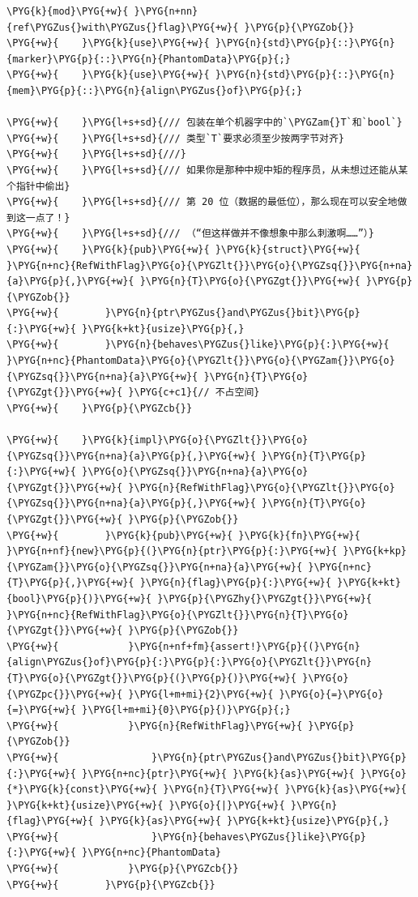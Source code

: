 \begin{Verbatim}[commandchars=\\\{\},breaklines=true,breakanywhere=true,fontsize=\codefont,xleftmargin=17bp]
\PYG{k}{mod}\PYG{+w}{ }\PYG{n+nn}{ref\PYGZus{}with\PYGZus{}flag}\PYG{+w}{ }\PYG{p}{\PYGZob{}}
\PYG{+w}{    }\PYG{k}{use}\PYG{+w}{ }\PYG{n}{std}\PYG{p}{::}\PYG{n}{marker}\PYG{p}{::}\PYG{n}{PhantomData}\PYG{p}{;}
\PYG{+w}{    }\PYG{k}{use}\PYG{+w}{ }\PYG{n}{std}\PYG{p}{::}\PYG{n}{mem}\PYG{p}{::}\PYG{n}{align\PYGZus{}of}\PYG{p}{;}

\PYG{+w}{    }\PYG{l+s+sd}{/// 包装在单个机器字中的`\PYGZam{}T`和`bool`}
\PYG{+w}{    }\PYG{l+s+sd}{/// 类型`T`要求必须至少按两字节对齐}
\PYG{+w}{    }\PYG{l+s+sd}{///}
\PYG{+w}{    }\PYG{l+s+sd}{/// 如果你是那种中规中矩的程序员，从未想过还能从某个指针中偷出}
\PYG{+w}{    }\PYG{l+s+sd}{/// 第 20 位（数据的最低位），那么现在可以安全地做到这一点了！}
\PYG{+w}{    }\PYG{l+s+sd}{/// （“但这样做并不像想象中那么刺激啊……”）}
\PYG{+w}{    }\PYG{k}{pub}\PYG{+w}{ }\PYG{k}{struct}\PYG{+w}{ }\PYG{n+nc}{RefWithFlag}\PYG{o}{\PYGZlt{}}\PYG{o}{\PYGZsq{}}\PYG{n+na}{a}\PYG{p}{,}\PYG{+w}{ }\PYG{n}{T}\PYG{o}{\PYGZgt{}}\PYG{+w}{ }\PYG{p}{\PYGZob{}}
\PYG{+w}{        }\PYG{n}{ptr\PYGZus{}and\PYGZus{}bit}\PYG{p}{:}\PYG{+w}{ }\PYG{k+kt}{usize}\PYG{p}{,}
\PYG{+w}{        }\PYG{n}{behaves\PYGZus{}like}\PYG{p}{:}\PYG{+w}{ }\PYG{n+nc}{PhantomData}\PYG{o}{\PYGZlt{}}\PYG{o}{\PYGZam{}}\PYG{o}{\PYGZsq{}}\PYG{n+na}{a}\PYG{+w}{ }\PYG{n}{T}\PYG{o}{\PYGZgt{}}\PYG{+w}{ }\PYG{c+c1}{// 不占空间}
\PYG{+w}{    }\PYG{p}{\PYGZcb{}}

\PYG{+w}{    }\PYG{k}{impl}\PYG{o}{\PYGZlt{}}\PYG{o}{\PYGZsq{}}\PYG{n+na}{a}\PYG{p}{,}\PYG{+w}{ }\PYG{n}{T}\PYG{p}{:}\PYG{+w}{ }\PYG{o}{\PYGZsq{}}\PYG{n+na}{a}\PYG{o}{\PYGZgt{}}\PYG{+w}{ }\PYG{n}{RefWithFlag}\PYG{o}{\PYGZlt{}}\PYG{o}{\PYGZsq{}}\PYG{n+na}{a}\PYG{p}{,}\PYG{+w}{ }\PYG{n}{T}\PYG{o}{\PYGZgt{}}\PYG{+w}{ }\PYG{p}{\PYGZob{}}
\PYG{+w}{        }\PYG{k}{pub}\PYG{+w}{ }\PYG{k}{fn}\PYG{+w}{ }\PYG{n+nf}{new}\PYG{p}{(}\PYG{n}{ptr}\PYG{p}{:}\PYG{+w}{ }\PYG{k+kp}{\PYGZam{}}\PYG{o}{\PYGZsq{}}\PYG{n+na}{a}\PYG{+w}{ }\PYG{n+nc}{T}\PYG{p}{,}\PYG{+w}{ }\PYG{n}{flag}\PYG{p}{:}\PYG{+w}{ }\PYG{k+kt}{bool}\PYG{p}{)}\PYG{+w}{ }\PYG{p}{\PYGZhy{}\PYGZgt{}}\PYG{+w}{ }\PYG{n+nc}{RefWithFlag}\PYG{o}{\PYGZlt{}}\PYG{n}{T}\PYG{o}{\PYGZgt{}}\PYG{+w}{ }\PYG{p}{\PYGZob{}}
\PYG{+w}{            }\PYG{n+nf+fm}{assert!}\PYG{p}{(}\PYG{n}{align\PYGZus{}of}\PYG{p}{:}\PYG{p}{:}\PYG{o}{\PYGZlt{}}\PYG{n}{T}\PYG{o}{\PYGZgt{}}\PYG{p}{(}\PYG{p}{)}\PYG{+w}{ }\PYG{o}{\PYGZpc{}}\PYG{+w}{ }\PYG{l+m+mi}{2}\PYG{+w}{ }\PYG{o}{=}\PYG{o}{=}\PYG{+w}{ }\PYG{l+m+mi}{0}\PYG{p}{)}\PYG{p}{;}
\PYG{+w}{            }\PYG{n}{RefWithFlag}\PYG{+w}{ }\PYG{p}{\PYGZob{}}
\PYG{+w}{                }\PYG{n}{ptr\PYGZus{}and\PYGZus{}bit}\PYG{p}{:}\PYG{+w}{ }\PYG{n+nc}{ptr}\PYG{+w}{ }\PYG{k}{as}\PYG{+w}{ }\PYG{o}{*}\PYG{k}{const}\PYG{+w}{ }\PYG{n}{T}\PYG{+w}{ }\PYG{k}{as}\PYG{+w}{ }\PYG{k+kt}{usize}\PYG{+w}{ }\PYG{o}{|}\PYG{+w}{ }\PYG{n}{flag}\PYG{+w}{ }\PYG{k}{as}\PYG{+w}{ }\PYG{k+kt}{usize}\PYG{p}{,}
\PYG{+w}{                }\PYG{n}{behaves\PYGZus{}like}\PYG{p}{:}\PYG{+w}{ }\PYG{n+nc}{PhantomData}
\PYG{+w}{            }\PYG{p}{\PYGZcb{}}
\PYG{+w}{        }\PYG{p}{\PYGZcb{}}


\end{Verbatim}
